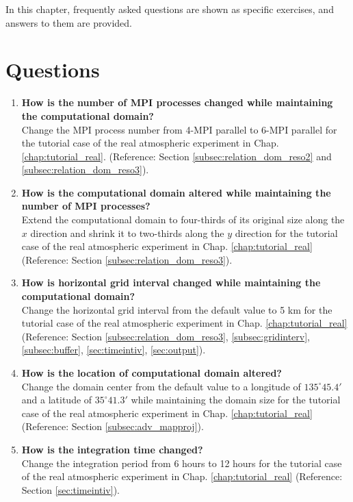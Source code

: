 
In this chapter, frequently asked questions are shown as specific exercises, and answers to them are provided. %

\section*{Questions}

\begin{enumerate}
\item {\bf How is the number of MPI processes changed while maintaining the computational domain?}\\
Change the MPI process number from 4-MPI parallel to 6-MPI parallel for the tutorial case of the real atmospheric experiment in Chap. \ref{chap:tutorial_real}.
(Reference: Section \ref{subsec:relation_dom_reso2} and \ref{subsec:relation_dom_reso3}).

\item {\bf How is the computational domain altered while maintaining the number of MPI processes?}\\
Extend the computational domain to four-thirds of its original size along the $x$ direction and shrink it to two-thirds along the $y$ direction for the tutorial case of the real atmospheric experiment in Chap. \ref{chap:tutorial_real} (Reference: Section \ref{subsec:relation_dom_reso3}).

\item {\bf How is horizontal grid interval changed while maintaining the computational domain?}\\ 
Change the horizontal grid interval from the default value to 5 km for the tutorial case of the real atmospheric experiment in Chap. \ref{chap:tutorial_real} (Reference: Section \ref{subsec:relation_dom_reso3}, \ref{subsec:gridinterv}, \ref{subsec:buffer}, \ref{sec:timeintiv}, \ref{sec:output}).

\item {\bf How is the location of computational domain altered?}\\
Change the domain center from the default value to a longitude of $135^\circ 45.4'$ and a latitude of $35^\circ 41.3'$ while maintaining the domain size for the tutorial case of the real atmospheric experiment in Chap. \ref{chap:tutorial_real} (Reference: Section \ref{subsec:adv_mapproj}).

\item {\bf How is the integration time changed?}\\
Change the integration period from 6 hours to 12 hours for the tutorial case of the real atmospheric experiment in Chap. \ref{chap:tutorial_real}
(Reference: Section \ref{sec:timeintiv}).


\end{enumerate}
